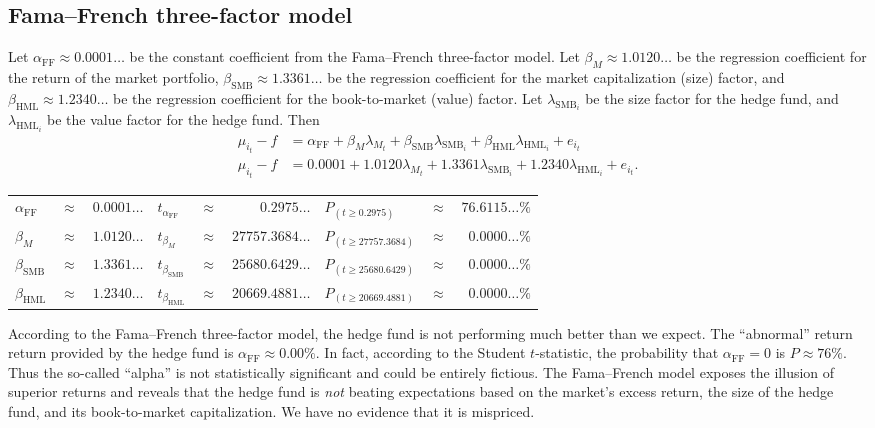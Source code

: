 \documentclass[12pt]{article}
\begin{document}
\subsection{Fama--French three-factor model}
Let $\alpha_{\mathrm{FF}}\approx 0.0001\dots$ be the constant coefficient from the Fama--French three-factor model. Let $\beta_M\approx 1.0120\dots$ be the regression coefficient for the return of the market portfolio, $\beta_{\mathrm{SMB}}\approx 1.3361\dots$ be the regression coefficient for the market capitalization (size) factor, and $\beta_{\mathrm{HML}}\approx 1.2340\dots$ be the regression coefficient for the book-to-market (value) factor. Let $\lambda_{{{\mathrm{SMB}}_i}}$ be the size factor for the hedge fund, and $\lambda_{{{\mathrm{HML}}_i}}$ be the value factor for the hedge fund. Then
\begin{align*}
\mu_{i_t}-f&=\alpha_{\mathrm{FF}}+\beta_M\lambda_{M_t}+\beta_{\mathrm{SMB}}\lambda_{{{\mathrm{SMB}}_i}}+\beta_{\mathrm{HML}}\lambda_{{{\mathrm{HML}}_i}}+e_{i_t}\\
\mu_{i_t}-f&=0.0001+1.0120\lambda_{M_t}+1.3361\lambda_{{{\mathrm{SMB}}_i}}+1.2340\lambda_{{{\mathrm{HML}}_i}}+e_{i_t}.
\end{align*}
\begin{center}
\begin{tabular}{lcr|lcr|lcr}
$\alpha_{\mathrm{FF}}$&$\approx$&$0.0001\dots$&$t_{\alpha_{\mathrm{FF}}}$&$\approx$&$0.2975\dots$&$P_{(t\geq 0.2975)}$&$\approx$&$76.6115\dots\%$\\
$\beta_M$&$\approx$&$1.0120\dots$&$t_{\beta_M}$&$\approx$&$27757.3684\dots$&$P_{(t\geq 27757.3684)}$&$\approx$&$0.0000\dots\%$\\
$\beta_{\mathrm{SMB}}$&$\approx$&$1.3361\dots$&$t_{\beta_{\mathrm{SMB}}}$&$\approx$&$25680.6429\dots$&$P_{(t\geq 25680.6429)}$&$\approx$&$0.0000\dots\%$\\
$\beta_{\mathrm{HML}}$&$\approx$&$1.2340\dots$&$t_{\beta_{\mathrm{HML}}}$&$\approx$&$20669.4881\dots$&$P_{(t\geq 20669.4881)}$&$\approx$&$0.0000\dots\%$
\end{tabular}
\end{center}
According to the Fama--French three-factor model, the hedge fund is not performing much better than we expect. The ``abnormal'' return return provided by the hedge fund is $\alpha_{\mathrm{FF}}\approx 0.00\%$. In fact, according to the Student $t$-statistic, the probability that $\alpha_{\mathrm{FF}}=0$ is $P\approx 76\%$. Thus the so-called ``alpha'' is not statistically significant and could be entirely fictious. The Fama--French model exposes the illusion of superior returns and reveals that the hedge fund is \textit{not} beating expectations based on the market's excess return, the size of the hedge fund, and its book-to-market capitalization. We have no evidence that it is mispriced.
\end{document}
